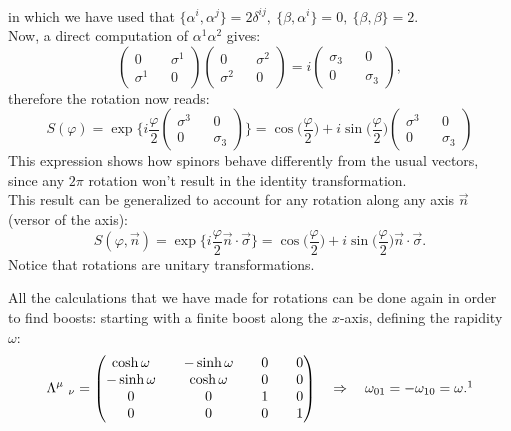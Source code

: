 \begin{example}
\begin{align*}
    \end{align*}
in which we have used that $\{\alpha^i,\alpha^j\}=2\delta^{ij},\ \{\beta,\alpha^i\}=0,\ \{\beta,\beta\}=2$.\\
Now, a direct computation of $\alpha^1\alpha^2$ gives:
\begin{equation*}
    \begin{pmatrix}
        0&&\sigma^1\\\sigma^1&&0
    \end{pmatrix}
    \begin{pmatrix}
        0&&\sigma^2\\\sigma^2&&0
    \end{pmatrix}
    =i\begin{pmatrix}
        \sigma_3&&0\\0&&\sigma_3
    \end{pmatrix},
\end{equation*}
therefore the rotation now reads:
\begin{equation*}
    S(\varphi)=\exp\bigg\{i\frac{\varphi}{2}\begin{pmatrix}
        \sigma^3&&0\\0&&\sigma_3
    \end{pmatrix}\bigg\}=\cos\bigg(\frac{\varphi}{2}\bigg)+i\sin\bigg(\frac{\varphi}{2}\bigg)\begin{pmatrix}
    \sigma^3&&0\\0&&\sigma_3
\end{pmatrix}
\end{equation*}
This expression shows how spinors behave differently from the usual vectors, since any $2\pi$ rotation won't result in the identity transformation.\\
This result can be generalized to account for any rotation along any axis $\vec n$ (versor of the axis):
\begin{equation*}
    S(\varphi,\vec n)=\exp\bigg\{i\frac{\varphi}{2}\vec n\cdot\vec\sigma\bigg\}=\cos\bigg(\frac{\varphi}{2}\bigg)+i\sin\bigg(\frac{\varphi}{2}\bigg)\vec n\cdot\vec\sigma.
\end{equation*}
Notice that rotations are unitary transformations.
\end{example}
All the calculations that we have made for rotations can be done again in order to find boosts: starting with a finite boost along the $x$-axis, defining the rapidity $\omega$:
\begin{equation*}
    \Lambda^\mu\ _\nu=\begin{pmatrix}
        \cosh\omega&&-\sinh\omega&&0&&0\\
        -\sinh\omega&&\cosh\omega&&0&&0\\
        0&&0&&1&&0\\
        0&&0&&0&&1
    \end{pmatrix}\quad\Rightarrow\quad \omega_{01}=-\omega_{10}=\omega.\footnotemark
\end{equation*}

